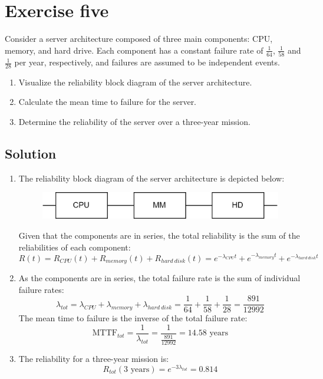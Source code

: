 \section{Exercise five}

Consider a server architecture composed of three main components: CPU, memory, and hard drive.
Each component has a constant failure rate of $\frac{1}{64}$, $\frac{1}{58}$ and $\frac{1}{28}$ per year, respectively, and failures are assumed to be independent events.
\begin{enumerate}
    \item Visualize the reliability block diagram of the server architecture.
    \item Calculate the mean time to failure for the server.
    \item Determine the reliability of the server over a three-year mission.
\end{enumerate}

\subsection*{Solution}
\begin{enumerate}
    \item The reliability block diagram of the server architecture is depicted below:
        \begin{figure}[H]
            \centering
            \includegraphics[width=0.5\linewidth]{images/server.png}
        \end{figure}
        Given that the components are in series, the total reliability is the sum of the reliabilities of each component:
        \[R(t)=R_{CPU}(t)+R_{memory}(t)+R_{hard\:disk}(t)=e^{-\lambda_{CPU}t}+e^{-\lambda_{memory}t}+e^{-\lambda_{hard\:disk}t}\]
    \item As the components are in series, the total failure rate is the sum of individual failure rates:
        \[\lambda_{tot}=\lambda_{CPU}+\lambda_{memory}+\lambda_{hard\:disk}=\dfrac{1}{64}+\dfrac{1}{58}+\dfrac{1}{28}=\dfrac{891}{12992}\]
        The mean time to failure is the inverse of the total failure rate:
        \[\text{MTTF}_{tot}=\dfrac{1}{\lambda_{tot}}=\dfrac{1}{\frac{891}{12992}}=14.58 \text{ years}\]
    \item The reliability for a three-year mission is:
        \[R_{tot}(3\text{ years})=e^{-3\lambda_{tot}}=0.814\]
\end{enumerate}